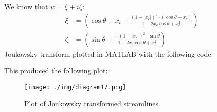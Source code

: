We know that $w = \xi + i\zeta$:
\begin{align}
    \xi   & = \left(\cos\theta - x_c + \frac{\left(1-\left|x_c\right|\right)^2 \cdot \left(\cos\theta - x_c\right)}{1 -2x_c\cos\theta + x_c^2}\right) \\
    \zeta & = \left(\sin\theta + \frac{-\left(1-\left|x_c\right|\right)^2 \cdot \sin\theta}{1 -2x_c\cos\theta + x_c^2}\right)
\end{align}
Joukowsky transform plotted in MATLAB with the following code:

This produced the following plot:
\begin{figure}[H]
    \centering
    \texttt{[image: ./img/diagram17.png]}
    \caption{Plot of Joukowsky transformed streamlines.}
\end{figure}
